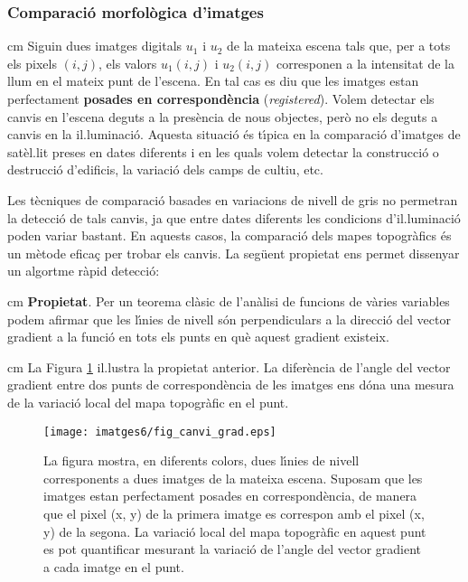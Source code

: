 \documentclass{article}
\begin{document}
\subsubsection{Comparaci\'o morfol\`ogica d'imatges}

 cm
Siguin dues imatges digitals $u_1$ i $u_2$ de la mateixa escena tals que, per a tots els pixels $(i, j)$, 
els valors $u_1(i, j)$ i $u_2(i, j)$ corresponen a la intensitat de la llum en el mateix punt 
de l'escena. En tal cas es diu que les imatges estan perfectament {\bf posades en correspond\`encia}
({\it registered}). 
Volem detectar els canvis en l'escena deguts a la pres\`encia de nous objectes,
per\`o no els deguts a canvis en la il.luminaci\'o. Aquesta situaci\'o \'es t\'\i pica en la comparaci\'o 
d'imatges de sat\`el.lit preses en dates diferents i en les quals volem detectar la construcci\'o
o destrucci\'o d'edificis, la variaci\'o dels camps de cultiu, etc.

Les t\`ecniques de comparaci\'o basades en variacions de nivell de gris no permetran la detecci\'o 
de tals canvis, ja que entre dates diferents les condicions d'il.luminaci\'o poden variar bastant.
En aquests casos, la comparaci\'o dels mapes topogr\`afics \'es un m\`etode efica\c{c} per trobar els
canvis. La seg\"uent propietat ens permet dissenyar un algortme r\`apid detecci\'o:

 cm
\noindent
{\bf Propietat}. Per un teorema cl\`asic de l'an\`alisi de funcions de v\`aries variables podem afirmar
que les l\'\i nies de nivell s\'on perpendiculars a la direcci\'o del vector gradient a la funci\'o en tots els
punts en qu\`e aquest gradient existeix. 

 cm
\noindent
La Figura \ref{fig_canvi_grad} il.lustra la propietat anterior. La difer\`encia de l'angle 
del vector gradient entre dos punts de correspond\`encia de les imatges ens d\'ona una mesura de la variaci\'o
local del mapa topogr\`afic en el punt.

\begin{figure}[htbp]
\begin{center}
\texttt{[image: imatges6/fig\_canvi\_grad.eps]}
\end{center}
\caption{La figura mostra, en diferents colors, dues l\'\i nies de nivell corresponents a dues imatges de la 
mateixa escena. Suposam que les imatges estan perfectament posades en correspond\`encia, 
de manera que el pixel (x, y) de la 
primera imatge es correspon amb el pixel (x, y) de la segona. 
La variaci\'o local del mapa topogr\`afic en aquest punt es pot quantificar mesurant la variaci\'o de l'angle 
del vector gradient a cada imatge en el punt.}
\label{fig_canvi_grad}
\end{figure}
\end{document}
